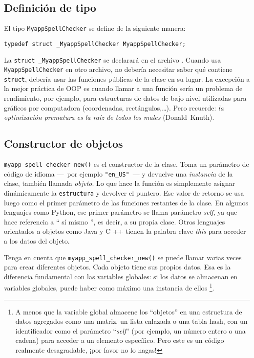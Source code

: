 \subsection{Definición de tipo}
El tipo \lstinline{MyappSpellChecker} se define de la siguiente manera:

\begin{lstlisting}
typedef struct _MyappSpellChecker MyappSpellChecker;
\end{lstlisting}

La \lstinline{struct _MyappSpellChecker} se declarará en el archivo . Cuando usa \lstinline{MyappSpellChecker} en otro archivo, no debería necesitar saber qué contiene \lstinline{struct}, debería usar las funciones públicas de la clase en su lugar. La excepción a la mejor práctica de OOP es cuando llamar a una función sería un problema de rendimiento, por ejemplo, para estructuras de datos de bajo nivel utilizadas para gráficos por computadora (coordenadas, rectángulos,…). Pero recuerde: \emph{la optimización prematura es la raíz de todos los males} (Donald~Knuth).

\subsection{Constructor de objetos}
\lstinline{myapp_spell_checker_new()} es el constructor de la clase. Toma un parámetro de código de idioma ---~por ejemplo \lstinline{"en_US"}~--- y devuelve una \emph{instancia} de la clase, también llamada \emph{objeto}. Lo que hace la función es simplemente asignar dinámicamente la \lstinline{estructura} y devolver el puntero. Ese valor de retorno se usa luego como el primer parámetro de las funciones restantes de la clase. En algunos lenguajes como Python, ese primer parámetro se llama parámetro \emph{self}, ya que hace referencia a `` sí mismo '', es decir, a su propia clase. Otros lenguajes orientados a objetos como Java y C ++ tienen la palabra clave \emph{this} para acceder a los datos del objeto.

Tenga en cuenta que \lstinline{myapp_spell_checker_new()} se puede llamar varias veces para crear diferentes objetos. Cada objeto tiene sus propios datos. Esa es la diferencia fundamental con las variables globales: si los datos se almacenan en variables globales, puede haber como máximo una instancia de ellos \footnote{A menos que la variable global almacene los ``objetos'' en una estructura de datos agregados como una matriz, un lista enlazada o una tabla hash, con un identificador como el parámetro ``\emph{self}'' (por ejemplo, un número entero o una cadena) para acceder a un elemento específico. Pero este es un código realmente desagradable, ¡por favor no lo hagas!}.

